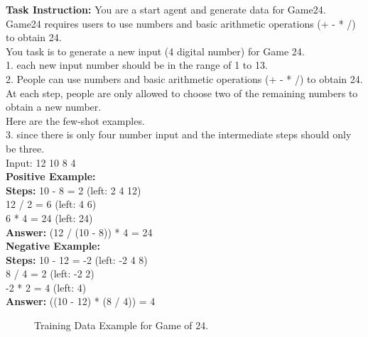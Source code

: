 \begin{tcolorbox}[breakable,title=Training Data Example for Game of 24]
\textcolor{my_blue!50}{\textbf{Task Instruction:} You are a start agent and generate data for Game24. Game24 requires users to use numbers and basic arithmetic operations (+ - * /) to obtain 24.\\
You task is to generate a new input (4 digital number) for Game 24.\\
1. each new input number should be in the range of 1 to 13.\\
2. People can use numbers and basic arithmetic operations (+ - * /) to obtain 24. At each step, people are only allowed to choose two of the remaining numbers to obtain a new number.\\
Here are the few-shot examples.\\
3. since there is only four number input and the intermediate steps should only be three.\\
Input: 12 10 8 4}\\

\textcolor{my_green!50}{\textbf{Positive Example:} }\\
\textcolor{my_purple}{\textbf{Steps:} 10 - 8 = 2 (left: 2 4 12)\\
12 / 2 = 6 (left: 4 6)\\
6 * 4 = 24 (left: 24)}\\
\textcolor{my_purple}{\textbf{Answer:} (12 / (10 - 8)) * 4 = 24}\\

\textcolor{my_green!50}{\textbf{Negative Example:} }\\
\textcolor{my_purple}{\textbf{Steps:} 10 - 12 = -2 (left: -2 4 8)\\
8 / 4 = 2 (left: -2 2)\\
-2 * 2 = 4 (left: 4)}\\
\textcolor{my_purple}{\textbf{Answer:} ((10 - 12) * (8 / 4)) = 4}\\

\end{tcolorbox}
\begin{figure}[!htp]
    \centering
    \vspace{-8pt}
    \caption{
    Training Data Example for Game of 24.
    }
    \label{fig:train_data_game24}
\end{figure}


